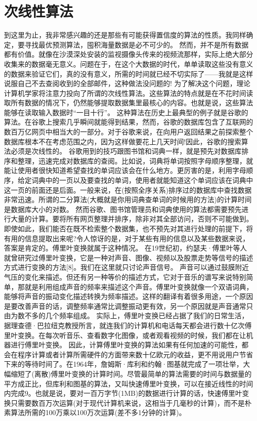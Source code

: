 \section{ 次线性算法} 
到这里为止，我非常感兴趣的还是那些有可能获得置信度的算法的性质。我同样确定，要寻找最优预测算法，囤积海量数据是必不可少的。
然而，并不是所有数据都有价值。就像在沙漠深处安装的监视摄像头传来的视频流那样，实际上绝大部分收集来的数据毫无意义。问题在于，在这个大数据的时代，单单读取这些没有意义的数据来验证它们，真的没有意义，所需的时间就已经不切实际了——我就是这样说服自己不去查阅收到的全部邮件，这种做法没问题的!
为了解决这个问题，理论计算机学家将注意力投向了所谓的次线性算法。这些算法的特点就是在不花时间读取所有数据的情况下，仍然能够提取数据集里最核心的内容。也就是说，这些算法能够在读取输入数据时“一目十行”。
这种算法在历史上最典型的例子就是谷歌的算法。在谷歌上搜索几乎瞬间就能得到结果，然而，谷歌的数据库包含了互联网的数百万亿网页中相当大的一部分。对于谷歌来说，在向用户返回结果之前探索整个数据库根本不在考虑范围之内，因为这样做要花上几天时间!因此，谷歌的搜索算法必须是次线性的。
谷歌用到的技巧跟图书馆和词典一样，就是预先对数据库排序和整理，迅速完成对数据库的查阅。比如说，词典将单词按照字母顺序整理，就能让使用者很快知道希望查找的单词应该会在什么地方。更厉害的是，利用字母顺序，给定词典中的一页以及要查找的单词，使用者就能知道这个单词应该在词典中这一页的前面还是后面。一般来说，在(按照全序关系)排序过的数据库中查找数据非常迅速。所谓的二分算法(大概就是你用词典查单词的时候用的方法)的计算时间是数据库大小的对数。
然而谷歌、图书馆管理员和词典使用的算法都需要预先进行大量的计算。要将所有网页整理并排序，除非对其全部访问，否则不可能做到。即使如此，我们能否在既不检索整个数据集，也不预先对其进行处理的前提下，将有用的信息提取出来呢?令人惊讶的是，对于某些有用的信息以及某些数据来说，答案是肯定的。傅里叶变换就属于这种情况。
在19世纪初，约瑟夫·傅里叶等人就曾研究过傅里叶变换，它是一种对声音、图像、视频以及股票走势等信号的描述方式进行变换的方法[8]。我们在这里就只讨论声音信号。
声音可以通过鼓膜附近气压的变化来描述。但还有另一种等价的描述方式，它对于音乐的谱写来说特别简单，那就是利用组成声音的频率来描述这个声音。傅里叶变换就像一个双语词典，能够将声音的振动变化描述转换为频率描述。这样的翻译有着很多用途，一个原因是要改善声音的话，调整频率通常比调整振动更有效，另一个原因就是声音通常只由为数不多的几个频率组成。
实际上，傅里叶变换已经占据了我们的日常生活，据理查德·巴拉纽克教授所言，就连我们的计算机和电话每天都会进行数十亿次傅里叶变换。在每次听音乐、查看数字化图像，或者观看视频的时候，我们都在让机器进行傅里叶变换。
因此，计算傅里叶变换的算法如果有任何加速的可能性，都会在程序计算或者计算所需硬件的方面带来数十亿欧元的收益，更不用说用户节省下来的等待时间了。在1964年，詹姆斯·库利和约翰·图基就完成了一项壮举，大幅缩短了(离散)傅里叶变换的计算时间。尽管最简单的算法需要的时间与数据量的平方成正比，但库利和图基的算法，又叫快速傅里叶变换，可以在接近线性的时间内完成9。也就是说，要对一百万字节(1MB)的数据进行计算的话，快速傅里叶变换只需要数百万次运算(对于现代计算机来说，这相当于几毫秒的计算)，而不是朴素算法所需的100万乘以100万次运算(差不多1分钟的计算)。
